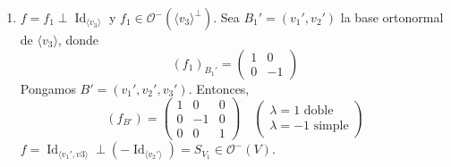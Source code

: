 \documentclass[12pt, a4paper, ones, notitlepage, openany,titlepage]{article}
\begin{document}
\begin{enumerate}[label=(\arabic*)]
	\item $f = f_1 \perp \operatorname{Id}_{\langle v_3 \rangle}$ y $f_1 \in \mathcal{O}^-(\langle v_3 \rangle^\perp)$. Sea $B_1' = (v_1', v_2')$ la base ortonormal de $\langle v_3 \rangle$, donde
	$$
	\left(f_1\right)_{B_1'} = \begin{pmatrix}
		1 & 0 \\
		0 & -1
	\end{pmatrix}
	$$
	Pongamos $B' = (v_1',v_2',v_3')$. Entonces,
	$$
	\left(f_{B'}\right) = \begin{pmatrix}
		1 & 0 & 0 \\
		0 & -1 & 0 \\
		0 & 0 & 1
	\end{pmatrix} \quad \begin{pmatrix}
		\lambda = 1 \text{ doble} \\
		\lambda = -1 \text{ simple}
	\end{pmatrix}
	$$
	$f = \operatorname{Id}_{\langle v_1',v3 \rangle} \perp (-\operatorname{Id}_{\langle v_2' \rangle}) = S_{V_1} \in \mathcal{O}^-(V)$.
	

\end{enumerate}
\end{document}
